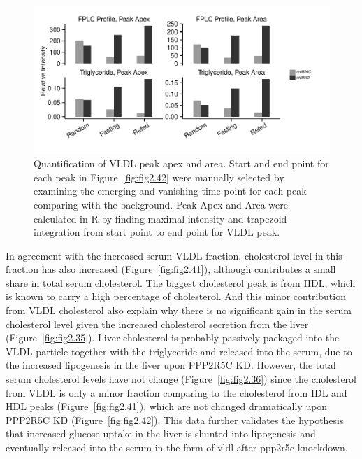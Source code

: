 \begin{figure}[htbp]
\centering
\includegraphics[width=1\textwidth]{figs/fig2-58 vldl_peak.pdf}
\caption[VLDL peak analysis]{\footnotesize Quantification of VLDL peak apex and area. Start and end point for each peak in Figure~\ref{fig:fig2.42} were manually selected by examining the emerging and vanishing time point for each peak comparing with the background. Peak Apex and Area were calculated in R by finding maximal intensity and trapezoid integration from start point to end point for VLDL peak.}
\label{fig:fig2.58}
\end{figure}

In agreement with the increased serum VLDL fraction, cholesterol level in this fraction has also increased (Figure~\ref{fig:fig2.41}), although contributes a small share in total serum cholesterol. The biggest cholesterol peak is from HDL, which is known to carry a high percentage of cholesterol. And this minor contribution from VLDL cholesterol also explain why there is no significant gain in the serum cholesterol level given the increased cholesterol secretion from the liver (Figure~\ref{fig:fig2.35}). Liver cholesterol is probably passively packaged into the VLDL particle together with the triglyceride and released into the serum, due to the increased lipogenesis in the liver upon PPP2R5C KD. However, the total serum cholesterol levels have not change (Figure~\ref{fig:fig2.36}) since the cholesterol from VLDL is only a minor fraction comparing to the cholesterol from IDL and HDL peaks (Figure~\ref{fig:fig2.41}), which are not changed dramatically upon PPP2R5C KD (Figure~\ref{fig:fig2.42}). This data further validates the hypothesis that increased glucose uptake in the liver is shunted into lipogenesis and eventually released into the serum in the form of \gls{vldl} after \gls{ppp2r5c} knockdown. 


